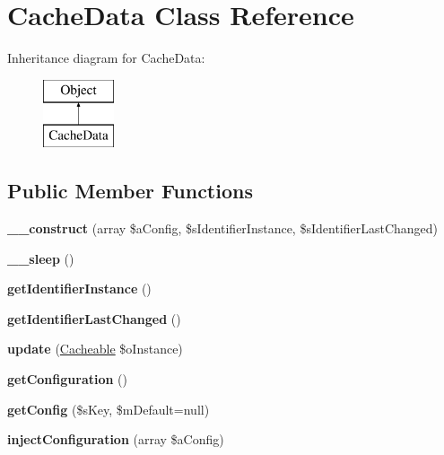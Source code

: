 \hypertarget{class_cache_data}{\section{Cache\-Data Class Reference}
\label{class_cache_data}
}
Inheritance diagram for Cache\-Data\-:\begin{figure}[H]
\begin{center}
\leavevmode
\includegraphics[height=2.000000cm]{class_cache_data}
\end{center}
\end{figure}
\subsection*{Public Member Functions}
\begin{DoxyCompactItemize}
\item 
\hypertarget{class_cache_data_aca2e1943eb6bb287f465a6806b16adc1}{{\bfseries \-\_\-\-\_\-construct} (array \$a\-Config, \$s\-Identifier\-Instance, \$s\-Identifier\-Last\-Changed)}\label{class_cache_data_aca2e1943eb6bb287f465a6806b16adc1}

\item 
\hypertarget{class_cache_data_aecde30deeb49d45b4f7992ac2f4652c4}{{\bfseries \-\_\-\-\_\-sleep} ()}\label{class_cache_data_aecde30deeb49d45b4f7992ac2f4652c4}

\item 
\hypertarget{class_cache_data_a8312f500f8541cd2319d6bc49d666779}{{\bfseries get\-Identifier\-Instance} ()}\label{class_cache_data_a8312f500f8541cd2319d6bc49d666779}

\item 
\hypertarget{class_cache_data_a0c36784d17e7ba34677289c63d1e19e7}{{\bfseries get\-Identifier\-Last\-Changed} ()}\label{class_cache_data_a0c36784d17e7ba34677289c63d1e19e7}

\item 
\hypertarget{class_cache_data_aaa52dbdd15c35fb42ecf0b4e8e9d1801}{{\bfseries update} (\hyperlink{class_cacheable}{Cacheable} \$o\-Instance)}\label{class_cache_data_aaa52dbdd15c35fb42ecf0b4e8e9d1801}

\item 
\hypertarget{class_cache_data_a093b5e7a54de96334715d4abf07f0b2a}{{\bfseries get\-Configuration} ()}\label{class_cache_data_a093b5e7a54de96334715d4abf07f0b2a}

\item 
\hypertarget{class_cache_data_a179bfbb48189d0b3476731a41020b21f}{{\bfseries get\-Config} (\$s\-Key, \$m\-Default=null)}\label{class_cache_data_a179bfbb48189d0b3476731a41020b21f}

\item 
\hypertarget{class_cache_data_a8fe8c8d91e306557b13b9bf31b4e60c0}{{\bfseries inject\-Configuration} (array \$a\-Config)}\label{class_cache_data_a8fe8c8d91e306557b13b9bf31b4e60c0}

\end{DoxyCompactItemize}
